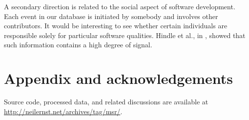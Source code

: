 \documentclass[conference, compsoc]{IEEEtran}
\begin{document}
A secondary direction is related to the social aspect of software development. Each event in our database is initiated by somebody and involves other contributors. It would be interesting to see whether certain individuals are responsible solely for particular software qualities. Hindle et al., in \cite{hindle09icpc}, showed that such information contains a high degree of signal.

\vspace{-2mm}
\section{Appendix and acknowledgements}
\vspace{-2mm}
\label{appendix}
Source code, processed data, and related discussions are available at \url{http://neilernst.net/archives/tag/msr/}.

\begin{footnotesize}
	\vspace{-2mm}
	

\vspace{-2mm}
\end{footnotesize}
\end{document}
